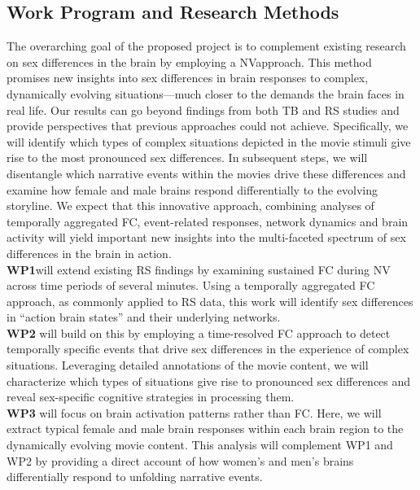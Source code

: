 \documentclass[11pt,a4paper]{article}
\begin{document}
\subsection*{Work Program and Research Methods}
The overarching goal of the proposed project is to complement existing research on sex differences in the brain by 
employing a NVapproach. This method promises new insights into sex differences in brain responses to complex, 
dynamically evolving situations—much closer to the demands the brain faces in real life. Our results can go beyond 
findings from both TB and RS studies and provide perspectives that previous approaches could not achieve. 
Specifically, we will identify which types of complex situations depicted in the movie stimuli give rise to the 
most pronounced sex differences. In subsequent steps, we will disentangle which narrative events within the 
movies drive these differences and examine how female and male brains respond differentially to the evolving storyline. 
We expect that this innovative approach, combining analyses of temporally aggregated 
FC, event-related responses, network dynamics and brain activity will yield important new insights into 
the multi-faceted spectrum of sex differences in the brain in action.\\
\textbf{WP1}will extend existing RS findings by examining sustained FC during NV across time periods of several 
minutes. Using a temporally aggregated FC approach, as commonly applied to RS data, this work will identify 
sex differences in “action brain states” and their underlying networks.\\
\textbf{WP2} will build on this by employing a time-resolved FC approach to detect temporally specific events 
that drive sex differences in the experience of complex situations. Leveraging detailed annotations of the 
movie content, we will characterize which types of situations give rise to pronounced sex differences and 
reveal sex-specific cognitive strategies in processing them.\\
\textbf{WP3} will focus on brain activation patterns rather than FC. Here, we will extract typical female 
and male brain responses within each brain region to the dynamically evolving movie content. This analysis will 
complement WP1 and WP2 by providing a direct account of how women's and men's brains differentially respond 
to unfolding narrative events.
\end{document}
